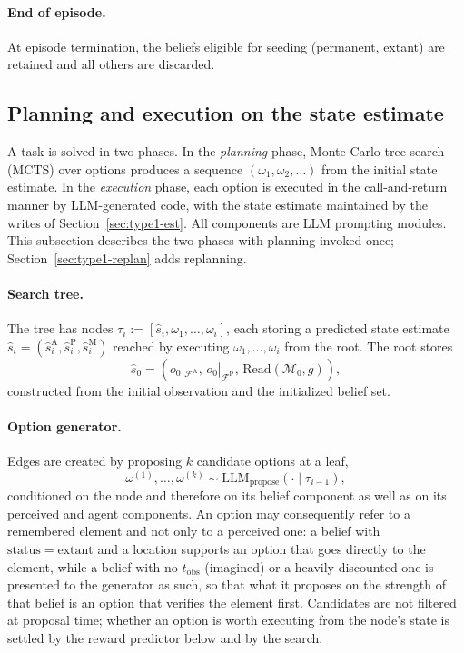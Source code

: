 \documentclass[11pt]{article}
\newcommand{\llm}[1]{\mathrm{LLM}_{\mathrm{#1}}}
\newcommand{\calF}{\mathcal{F}}
\newcommand{\calM}{\mathcal{M}}
\newcommand{\shat}{\hat{s}}
\newcommand{\FA}{\calF^{\mathrm{A}}}
\newcommand{\FP}{\calF^{\mathrm{P}}}
\newcommand{\Read}{\mathrm{Read}}
\newcommand{\stat}{\mathrm{status}}
\newcommand{\tobs}{t_{\mathrm{obs}}}
\begin{document}
\paragraph{End of episode.}
At episode termination, the beliefs eligible for seeding (permanent, extant) are retained and all others are discarded. 

\subsection{Planning and execution on the state estimate}
\label{sec:type1-plan}

A task is solved in two phases. In the \emph{planning} phase, Monte Carlo tree search (MCTS) over options produces a sequence $(\omega_1,\omega_2,\dots)$ from the initial state estimate. In the \emph{execution} phase, each option is executed in the call-and-return manner by LLM-generated code, with the state estimate maintained by the writes of Section~\ref{sec:type1-est}. All components are LLM prompting modules. This subsection describes the two phases with planning invoked once; Section~\ref{sec:type1-replan} adds replanning.

\paragraph{Search tree.}
The tree has nodes $\tau_i:=[\shat_i,\omega_1,\dots,\omega_i]$, each storing a predicted state estimate $\shat_i=(\hat s^{\mathrm{A}}_i,\hat s^{\mathrm{P}}_i,\hat s^{\mathrm{M}}_i)$ reached by executing $\omega_1,\dots,\omega_i$ from the root. The root stores
\begin{equation}
\shat_0=(o_0|_{\FA},\,o_0|_{\FP},\,\Read(\calM_0,g)),
\label{eq:root}
\end{equation}
constructed from the initial observation and the initialized belief set.

\paragraph{Option generator.}
Edges are created by proposing $k$ candidate options at a leaf,
\begin{equation}
\omega^{(1)},\dots,\omega^{(k)}\sim \llm{propose}(\cdot\mid\tau_{i-1}),
\label{eq:generator}
\end{equation}
conditioned on the node and therefore on its belief component as well as on its perceived and agent components. An option may consequently refer to a remembered element and not only to a perceived one: a belief with $\stat=\mathrm{extant}$ and a location supports an option that goes directly to the element, while a belief with no $\tobs$ (imagined) or a heavily discounted one is presented to the generator as such, so that what it proposes on the strength of that belief is an option that verifies the element first. Candidates are not filtered at proposal time; whether an option is worth executing from the node's state is settled by the reward predictor below and by the search.
\end{document}
